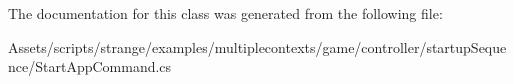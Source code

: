 The documentation for this class was generated from the following file\-:\begin{DoxyCompactItemize}
\item 
Assets/scripts/strange/examples/multiplecontexts/game/controller/startup\-Sequence/Start\-App\-Command.\-cs\end{DoxyCompactItemize}
